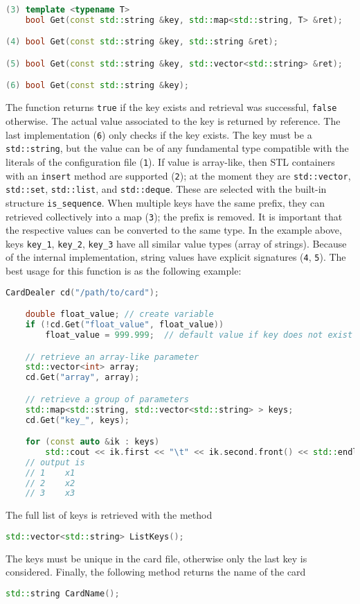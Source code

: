 \documentclass[a4paper, 11pt]{article}
\begin{document}
\begin{lstlisting}[language=C++]
(3) template <typename T>
    bool Get(const std::string &key, std::map<std::string, T> &ret);

(4) bool Get(const std::string &key, std::string &ret);

(5) bool Get(const std::string &key, std::vector<std::string> &ret);

(6) bool Get(const std::string &key);
\end{lstlisting}
The function returns \texttt{true} if the key exists and retrieval was successful, %
\texttt{false} otherwise.
The actual value associated to the key is returned by reference.
The last implementation (\texttt{6}) only checks if the key exists.
The key must be a \texttt{std::string}, but the value can be of any fundamental type compatible with the literals of the configuration file (\texttt{1}).
If value is array-like, then STL containers with an \texttt{insert} method are supported (\texttt{2}); %
at the moment they are \texttt{std::vector},  \texttt{std::set},  \texttt{std::list},  and \texttt{std::deque}. 
These are selected with the built-in structure \texttt{is\_sequence}.
When multiple keys have the same prefix, they can retrieved collectively into a map (\texttt{3}); the prefix is removed.
It is important that the respective values can be converted to the same type.
In the example above, keys \texttt{key\_1}, \texttt{key\_2}, \texttt{key\_3} have all similar value types (array of strings).
Because of the internal implementation, string values have explicit signatures (\texttt{4}, \texttt{5}).
The best usage for this function is as the following example:
\begin{lstlisting}[language=C++]
	CardDealer cd("/path/to/card");

	double float_value; // create variable
	if (!cd.Get("float_value", float_value))
		float_value = 999.999;	// default value if key does not exist

	// retrieve an array-like parameter
	std::vector<int> array;
	cd.Get("array", array);

	// retrieve a group of parameters
	std::map<std::string, std::vector<std::string> > keys;
	cd.Get("key_", keys);

	for (const auto &ik : keys)
		std::cout << ik.first << "\t" << ik.second.front() << std::endl;
	// output is
	// 1	x1
	// 2	x2
	// 3	x3
\end{lstlisting}

The full list of keys is retrieved with the method
\begin{lstlisting}[language=C++]
    std::vector<std::string> ListKeys();
\end{lstlisting}
The keys must be unique in the card file, otherwise only the last key is considered.
Finally, the following method returns the name of the card
\begin{lstlisting}[language=C++]
    std::string CardName();
\end{lstlisting}
\end{document}
